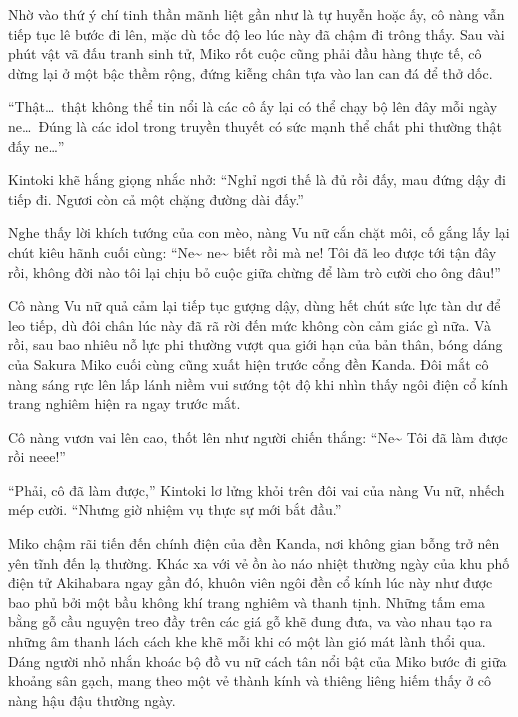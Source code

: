 \documentclass[../main.tex]{subfiles}
\begin{document}
Nhờ vào thứ ý chí tinh thần mãnh liệt gần như là tự huyễn hoặc ấy, cô nàng vẫn tiếp tục lê bước đi lên, mặc dù tốc độ leo lúc này đã chậm đi trông thấy. Sau vài phút vật vã đấu tranh sinh tử, Miko rốt cuộc cũng phải đầu hàng thực tế, cô dừng lại ở một bậc thềm rộng, đứng kiễng chân tựa vào lan can đá để thở dốc.


``Thật\dots\ thật không thể tin nổi là các cô ấy lại có thể chạy bộ lên đây mỗi ngày ne\dots\ Đúng là các idol trong truyền thuyết có sức mạnh thể chất phi thường thật đấy ne\dots''

Kintoki khẽ hắng giọng nhắc nhở: ``Nghỉ ngơi thế là đủ rồi đấy, mau đứng dậy đi tiếp đi. Ngươi còn cả một chặng đường dài đấy.''

Nghe thấy lời khích tướng của con mèo, nàng Vu nữ cắn chặt môi, cố gắng lấy lại chút kiêu hãnh cuối cùng: ``Ne\~{} ne\~{} biết rồi mà ne! Tôi đã leo được tới tận đây rồi, không đời nào tôi lại chịu bỏ cuộc giữa chừng để làm trò cười cho ông đâu!''

Cô nàng Vu nữ quả cảm lại tiếp tục gượng dậy, dùng hết chút sức lực tàn dư để leo tiếp, dù đôi chân lúc này đã rã rời đến mức không còn cảm giác gì nữa. Và rồi, sau bao nhiêu nỗ lực phi thường vượt qua giới hạn của bản thân, bóng dáng của Sakura Miko cuối cùng cũng xuất hiện trước cổng đền Kanda. Đôi mắt cô nàng sáng rực lên lấp lánh niềm vui sướng tột độ khi nhìn thấy ngôi điện cổ kính trang nghiêm hiện ra ngay trước mắt.

Cô nàng vươn vai lên cao, thốt lên như người chiến thắng: ``Ne\~{} Tôi đã làm được rồi neee!''


``Phải, cô đã làm được,'' Kintoki lơ lửng khỏi trên đôi vai của nàng Vu nữ, nhếch mép cười. ``Nhưng giờ nhiệm vụ thực sự mới bắt đầu.''

\ct

Miko chậm rãi tiến đến chính điện của đền Kanda, nơi không gian bỗng trở nên yên tĩnh đến lạ thường. Khác xa với vẻ ồn ào náo nhiệt thường ngày của khu phố điện tử Akihabara ngay gần đó, khuôn viên ngôi đền cổ kính lúc này như được bao phủ bởi một bầu không khí trang nghiêm và thanh tịnh. Những tấm ema bằng gỗ cầu nguyện treo đầy trên các giá gỗ khẽ đung đưa, va vào nhau tạo ra những âm thanh lách cách khe khẽ mỗi khi có một làn gió mát lành thổi qua. Dáng người nhỏ nhắn khoác bộ đồ vu nữ cách tân nổi bật của Miko bước đi giữa khoảng sân gạch, mang theo một vẻ thành kính và thiêng liêng hiếm thấy ở cô nàng hậu đậu thường ngày.
\end{document}
